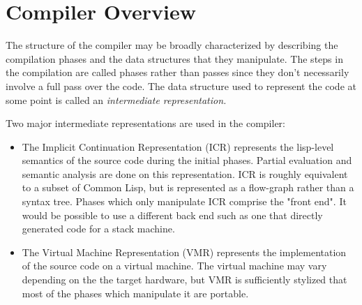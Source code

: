 \chapter{Compiler Overview} %

The structure of the compiler may be broadly characterized by describing the
compilation phases and the data structures that they manipulate.  The steps in
the compilation are called phases rather than passes since they don't
necessarily involve a full pass over the code.  The data structure used to
represent the code at some point is called an {\it intermediate
representation.}

Two major intermediate representations are used in the compiler:
\begin{itemize}

\item The Implicit Continuation Representation (ICR) represents the lisp-level
semantics of the source code during the initial phases.  Partial evaluation and
semantic analysis are done on this representation.  ICR is roughly equivalent
to a subset of Common Lisp, but is represented as a flow-graph rather than a
syntax tree.  Phases which only manipulate ICR comprise the "front end".  It
would be possible to use a different back end such as one that directly
generated code for a stack machine.

\item The Virtual Machine Representation (VMR) represents the implementation of
the source code on a virtual machine.  The virtual machine may vary depending
on the the target hardware, but VMR is sufficiently stylized that most of the
phases which manipulate it are portable.
\end{itemize}

